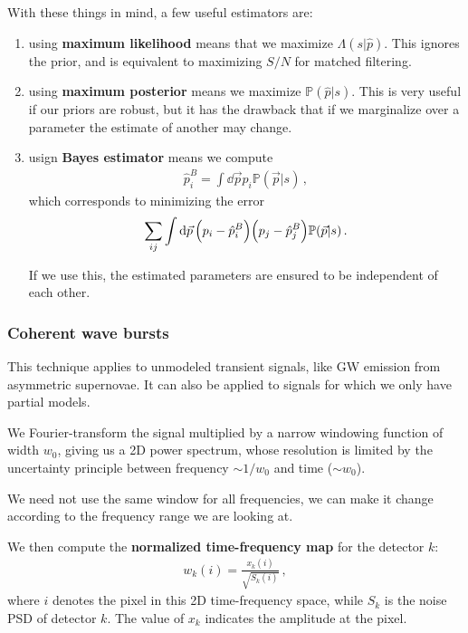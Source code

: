 \documentclass[main.tex]{subfiles}
\begin{document}
With these things in mind, a few useful estimators are:
\begin{enumerate}
    \item using \textbf{maximum likelihood} means that we maximize \(\Lambda (s | \hat{p})\).
    This ignores the prior, and is equivalent to maximizing \(S / N\) for matched filtering. 
    \item using \textbf{maximum posterior} means we maximize \(\mathbb{P}(\hat{p} | s)\).
    This is very useful if our priors are robust, but it has the drawback that if we marginalize over a parameter the estimate of another may change.  
    \item usign \textbf{Bayes estimator} means we compute 
    \begin{align}
    \hat{p}_{i}^{B} = \int \dd{\vec{p}} p_{i} \mathbb{P}(\vec{p} | s)
    \,,
    \end{align}
    which corresponds to minimizing the error 
    \begin{align}
    \sum _{ij} \int \dd{\vec{p}} 
    \qty(p_i - \hat{p}^{B}_{i})
    \qty(p_j - \hat{p}^{B}_{j})
    \mathbb{P}(\vec{p} | s)
    \,.
    \end{align}
    
    If we use this, the estimated parameters are ensured to be independent of each other. 
\end{enumerate}

\subsubsection{Coherent wave bursts}

This technique applies to unmodeled transient signals, like GW emission from asymmetric supernovae. It can also be applied to signals for which we only have partial models. 

We Fourier-transform the signal multiplied by a narrow windowing function of width \(w_0 \), giving us a 2D power spectrum, whose resolution is limited by the uncertainty principle between frequency \(\sim 1/ w_0 \) and time (\(\sim w_0 \)).

We need not use the same window for all frequencies, we can make it change according to the frequency range we are looking at.

We then compute the \textbf{normalized time-frequency map} for the detector \(k\): 
%
\begin{align}
w_k (i) = \frac{x_k(i)}{\sqrt{S_k (i)}}
\,,
\end{align}
%
where \(i\) denotes the pixel in this 2D time-frequency space, while \(S_k\) is the noise PSD of detector \(k\). 
The value of \(x_k\) indicates the amplitude at the pixel.
\end{document}
